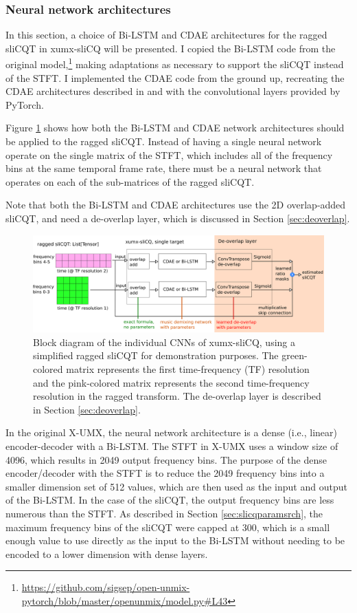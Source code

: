 \documentclass[report.tex]{subfiles}
\begin{document}
\subsubsection{Neural network architectures}
\label{sec:slicqarches}

In this section, a choice of Bi-LSTM and CDAE architectures for the ragged sliCQT in xumx-sliCQ will be presented. I copied the Bi-LSTM code from the original model,\footnote{\url{https://github.com/sigsep/open-unmix-pytorch/blob/master/openunmix/model.py\#L43}} making adaptations as necessary to support the sliCQT instead of the STFT. I implemented the CDAE code from the ground up, recreating the CDAE architectures described in \textcite{plumbley1} and \textcite{plumbley2} with the convolutional layers provided by PyTorch.

Figure \ref{fig:cdaeslicqt} shows how both the Bi-LSTM and CDAE network architectures should be applied to the ragged sliCQT. Instead of having a single neural network operate on the single matrix of the STFT, which includes all of the frequency bins at the same temporal frame rate, there must be a neural network that operates on each of the sub-matrices of the ragged sliCQT.

Note that both the Bi-LSTM and CDAE architectures use the 2D overlap-added sliCQT, and need a de-overlap layer, which is discussed in Section \ref{sec:deoverlap}.

\begin{figure}[ht]
	\centering
	\includegraphics[width=\textwidth]{./images-blockdiagrams/xumx_slicq_pertarget_cdae_bilstm.png}
	\caption{Block diagram of the individual CNNs of xumx-sliCQ, using a simplified ragged sliCQT for demonstration purposes. The green-colored matrix represents the first time-frequency (TF) resolution and the pink-colored matrix represents the second time-frequency resolution in the ragged transform. The de-overlap layer is described in Section \ref{sec:deoverlap}.}
	\label{fig:cdaeslicqt}
\end{figure}

In the original X-UMX, the neural network architecture is a dense (i.e., linear) encoder-decoder with a Bi-LSTM. The STFT in X-UMX uses a window size of 4096, which results in 2049 output frequency bins. The purpose of the dense encoder/decoder with the STFT is to reduce the 2049 frequency bins into a smaller dimension set of 512 values, which are then used as the input and output of the Bi-LSTM. In the case of the sliCQT, the output frequency bins are less numerous than the STFT. As described in Section \ref{sec:slicqparamsrch}, the maximum frequency bins of the sliCQT were capped at 300, which is a small enough value to use directly as the input to the Bi-LSTM without needing to be encoded to a lower dimension with dense layers.
\end{document}
